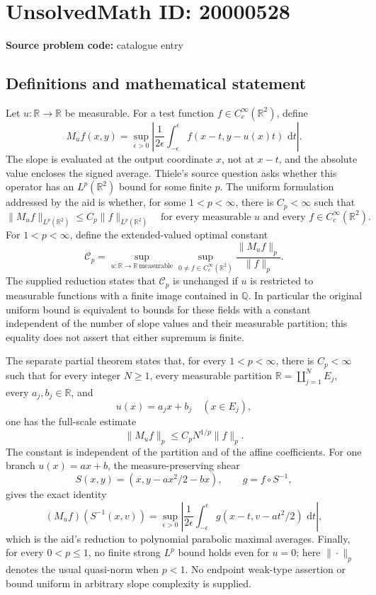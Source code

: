 \documentclass[11pt]{article}
\newcommand{\Q}{\mathbb{Q}}
\newcommand{\R}{\mathbb{R}}
\newcommand{\dd}{\,\mathrm{d}}
\begin{document}
\section*{UnsolvedMath ID: 20000528}
\textbf{Source problem code:} catalogue entry
\subsection{Definitions and mathematical statement}
Let \(u:\R\to\R\) be measurable. For a test function \(f\in C_c^\infty(\R^2)\), define
\[
 M_uf(x,y)=\sup_{\epsilon>0}\left|
 \frac{1}{2\epsilon}\int_{-\epsilon}^{\epsilon}f(x-t,y-u(x)t)\,\dd t\right|.
\]
The slope is evaluated at the output coordinate \(x\), not at \(x-t\), and the absolute value encloses the signed average. Thiele's source question asks whether this operator has an \(L^p(\R^2)\) bound for some finite \(p\). The uniform formulation addressed by the aid is whether, for some \(1<p<\infty\), there is \(C_p<\infty\) such that
\[
 \|M_uf\|_{L^p(\R^2)}\leq C_p\|f\|_{L^p(\R^2)}
 \quad\text{for every measurable }u\text{ and every }f\in C_c^\infty(\R^2).
\]
For \(1<p<\infty\), define the extended-valued optimal constant
\[
 \mathcal C_p=\sup_{u:\R\to\R\,\mathrm{measurable}}
 \sup_{0\neq f\in C_c^\infty(\R^2)}\frac{\|M_uf\|_p}{\|f\|_p}.
\]
The supplied reduction states that \(\mathcal C_p\) is unchanged if \(u\) is restricted to measurable functions with a finite image contained in \(\Q\). In particular the original uniform bound is equivalent to bounds for these fields with a constant independent of the number of slope values and their measurable partition; this equality does not assert that either supremum is finite.

The separate partial theorem states that, for every \(1<p<\infty\), there is \(C_p<\infty\) such that for every integer \(N\geq1\), every measurable partition \(\R=\coprod_{j=1}^N E_j\), every \(a_j,b_j\in\R\), and
\[
 u(x)=a_jx+b_j\quad(x\in E_j),
\]
one has the full-scale estimate
\[
 \|M_uf\|_p\leq C_p N^{1/p}\|f\|_p.
\]
The constant is independent of the partition and of the affine coefficients. For one branch \(u(x)=ax+b\), the measure-preserving shear
\[
 S(x,y)=(x,y-ax^2/2-bx),\qquad g=f\circ S^{-1},
\]
gives the exact identity
\[
 (M_uf)(S^{-1}(x,v))=
 \sup_{\epsilon>0}\left|\frac{1}{2\epsilon}
 \int_{-\epsilon}^{\epsilon}g(x-t,v-at^2/2)\,\dd t\right|,
\]
which is the aid's reduction to polynomial parabolic maximal averages. Finally, for every \(0<p\leq1\), no finite strong \(L^p\) bound holds even for \(u=0\); here \(\|\cdot\|_p\) denotes the usual quasi-norm when \(p<1\). No endpoint weak-type assertion or bound uniform in arbitrary slope complexity is supplied.
\end{document}
